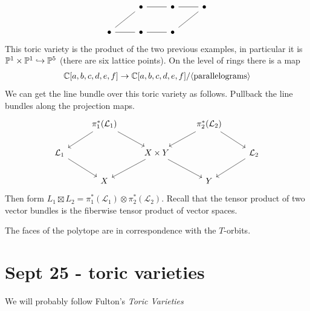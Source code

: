 \documentclass[12pt]{article}
\begin{document}
\begin{example}
    \[\begin{tikzcd}
	& \bullet & \bullet & \bullet \\
	\bullet & \bullet & \bullet
	\arrow[no head, from=2-1, to=2-2]
	\arrow[no head, from=2-2, to=2-3]
	\arrow[no head, from=2-3, to=1-4]
	\arrow[no head, from=2-1, to=1-2]
	\arrow[no head, from=1-2, to=1-3]
	\arrow[no head, from=1-3, to=1-4]
\end{tikzcd}\]
This toric variety is the product of the two previous examples, in particular it is $\P^1\times\P^1\hookrightarrow\P^5$ (there are six lattice points). On the level of rings there is a map \begin{align*}
    \C[a,b,c,d,e,f]\to \C[a,b,c,d,e,f] / \langle \text{parallelograms}\rangle
\end{align*}
We can get the line bundle over this toric variety as follows. Pullback the line bundles along the projection maps.
\[\begin{tikzcd}
	& {\pi_1^*(\mathcal{L}_1)} && {\pi_2^*(\mathcal{L}_2)} \\
	{\mathcal{L}_1} && {X\times Y} && {\mathcal{L}_2} \\
	& X && Y
	\arrow[from=2-3, to=3-2]
	\arrow[from=2-3, to=3-4]
	\arrow[from=2-1, to=3-2]
	\arrow[from=2-5, to=3-4]
	\arrow[from=1-4, to=2-3]
	\arrow[from=1-4, to=2-5]
	\arrow[from=1-2, to=2-1]
	\arrow[from=1-2, to=2-3]
\end{tikzcd}\]
Then form $L_1 \boxtimes L_2= \pi_1^*(\mathcal{L}_1) \otimes\pi_2^*(\mathcal{L}_2) $. Recall that the tensor product of two vector bundles is the fiberwise tensor product of vector spaces.
\end{example}
\begin{fact}
    The faces of the polytope are in correspondence with the $T$-orbits.
\end{fact}
\section{Sept 25 - toric varieties}
We will probably follow Fulton's \textit{Toric Varieties}
\end{document}
